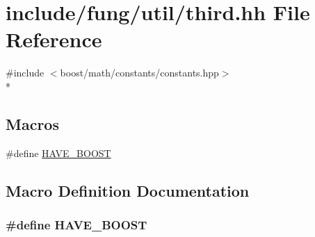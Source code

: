 \hypertarget{third_8hh}{\section{include/fung/util/third.hh File Reference}
\label{third_8hh}
}
{\ttfamily \#include $<$boost/math/constants/constants.\-hpp$>$}\\*
\subsection*{Macros}
\begin{DoxyCompactItemize}
\item 
\#define \hyperlink{third_8hh_a1644f282a4f84575a270f96b98d4f3c6}{H\-A\-V\-E\-\_\-\-B\-O\-O\-S\-T}
\end{DoxyCompactItemize}


\subsection{Macro Definition Documentation}
\hypertarget{third_8hh_a1644f282a4f84575a270f96b98d4f3c6}{
\subsubsection[{H\-A\-V\-E\-\_\-\-B\-O\-O\-S\-T}]{\setlength{\rightskip}{0pt plus 5cm}\#define H\-A\-V\-E\-\_\-\-B\-O\-O\-S\-T}}\label{third_8hh_a1644f282a4f84575a270f96b98d4f3c6}
